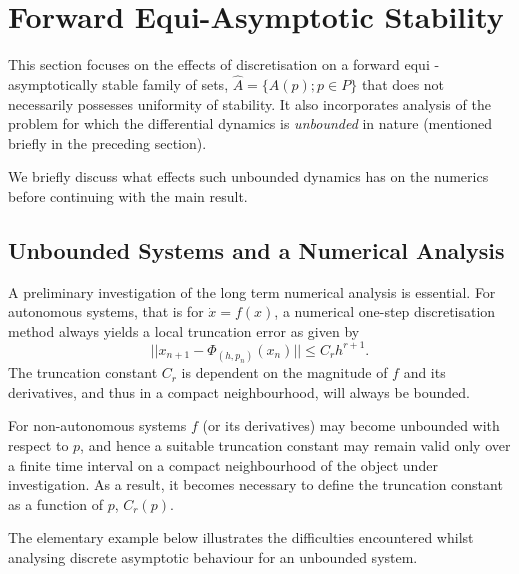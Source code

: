 \section{Forward Equi-Asymptotic Stability}
\label{disfassec}

This section focuses on the effects of discretisation on a forward
equi - asymptotically stable family of sets,  $\hat{A} = \{A(p) ; p \in
P\}$ that does not necessarily possesses uniformity of stability. It also
incorporates analysis of the problem for which the differential
dynamics is \textit{unbounded} in nature (mentioned
briefly in the preceding section).

We briefly discuss what effects such unbounded dynamics
has on the numerics before continuing with the
main result.

\subsection{Unbounded Systems and a Numerical Analysis}

A preliminary investigation of the long term numerical analysis is
essential. For autonomous systems, that is for $\dot{x} = f(x)$, a
numerical one-step discretisation method always yields a local
truncation error as given by
\[ ||x_{n+1} - \Phi_{(h,p_n)}(x_n)|| \leq C_{r}h^{r+1}. \]
The truncation constant $C_r$ is dependent on the magnitude of
$f$ and its derivatives, and thus in a compact neighbourhood,
will always be bounded.

For non-autonomous systems $f$ (or its derivatives) may become
unbounded with respect to $p$, and hence a suitable truncation
constant may remain valid only over a finite time interval on a
compact neighbourhood of the object under investigation. As a
result, it becomes necessary to define the truncation constant as a
function of $p$, $C_r(p)$.

The elementary example below illustrates the difficulties encountered
whilst analysing discrete asymptotic behaviour for an unbounded
system.

